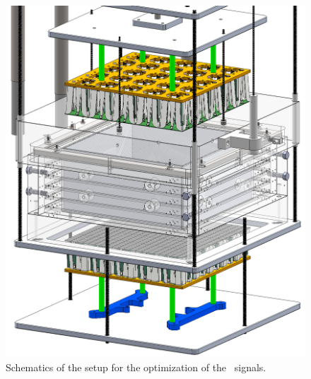 \begin{figure}[!t]
\centering
\includegraphics[height=0.8\textheight]{./Figures/mini-proto.png}
\caption[Schematics of the setup for the optimization of the \STwo\ signals]{Schematics of the setup for the optimization of the \STwo\ signals.}
\label{fig:mini-proto}
\end{figure}

